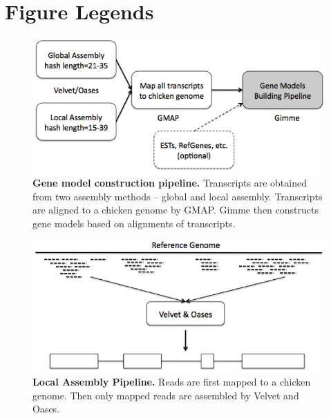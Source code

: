 \documentclass[10pt]{article}
\begin{document}
\section*{Figure Legends}
\begin{figure}[!ht]
\begin{center}
\includegraphics[width=5in]{figure1.png}
\end{center}
\caption{
{\bf Gene model construction pipeline.} Transcripts are obtained from two assembly methods -- global and local assembly.
Transcripts are aligned to a chicken genome by GMAP. Gimme then constructs gene models based on alignments of transcripts.
}
\label{figure1}
\end{figure}

\begin{figure}[!ht]
\begin{center}
\includegraphics[width=5in]{figure2.png}
\end{center}
\caption{
{\bf Local Assembly Pipeline.}
Reads are first mapped to a chicken genome.
Then only mapped reads are assembled by Velvet and Oases.
}
\label{figure2}
\end{figure}
\end{document}
